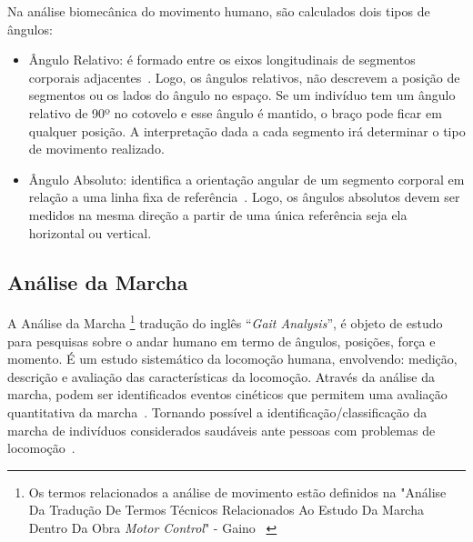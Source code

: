 Na análise biomecânica do movimento humano, são calculados dois tipos de ângulos:
	\begin{itemize}
		\item Ângulo Relativo: é formado entre os eixos longitudinais de segmentos corporais adjacentes~\cite{hamill1999bases}. Logo, os ângulos relativos, não descrevem a posição de segmentos ou os lados do ângulo no espaço. Se um indivíduo tem um ângulo relativo de 90º no cotovelo e esse ângulo é mantido, o braço pode ficar em qualquer posição. A interpretação dada a cada segmento irá determinar o tipo de movimento realizado. 
		\item Ângulo Absoluto: identifica a orientação angular de um segmento corporal em relação a uma linha fixa de referência~\cite{hamill1999bases}. Logo, os ângulos absolutos devem ser medidos na mesma direção a partir de uma única referência seja ela horizontal ou vertical.
	\end{itemize}




\subsection{Análise da Marcha}\label{section:analise_marcha}

A Análise da Marcha \footnote{Os termos relacionados a análise de movimento estão definidos na "Análise Da Tradução De Termos Técnicos Relacionados Ao Estudo Da Marcha Dentro Da Obra \textit{Motor Control}" - Gaino ~\cite{traducaogait2011}} tradução do inglês ``\textit{Gait Analysis}'', é objeto de estudo para pesquisas sobre o andar humano em termo de ângulos, posições, força e momento. É um estudo sistemático da locomoção humana, envolvendo: medição, descrição e avaliação das características da locomoção. Através da análise da marcha, podem ser identificados eventos cinéticos que permitem uma avaliação quantitativa da marcha~\cite{gaitusingsensorsreview2012}. Tornando possível a identificação/classificação da marcha de indivíduos considerados saudáveis ante pessoas com problemas de locomoção~\cite{gaitusingsensorsreview2012,turcot2008}.

